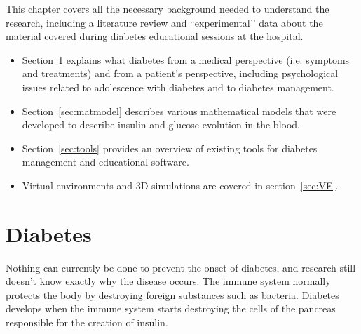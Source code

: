 




This chapter covers all the necessary background needed to understand the research, including a literature review and ``experimental’’ data about the material covered during diabetes educational sessions at the hospital.
\begin{itemize}
\item Section~\ref{sec:diab} explains what diabetes from a medical perspective (i.e. symptoms and treatments) and from a patient’s perspective, including psychological issues related to adolescence with diabetes and to diabetes management.
\item Section~\ref{sec:matmodel} describes various mathematical models that were developed to describe insulin and glucose evolution in the blood.
\item Section~\ref{sec:tools} provides an overview of existing tools for diabetes management and educational software.
\item Virtual environments and 3D simulations are covered in section~\ref{sec:VE}.
\end{itemize}


\section{Diabetes}
\label{sec:diab}

Nothing can currently be done to prevent the onset of diabetes, and research still doesn't know exactly why the disease occurs. The immune system normally protects the body by destroying foreign substances such as bacteria. Diabetes develops when the immune system starts destroying the cells of the pancreas responsible for the creation of insulin. 

